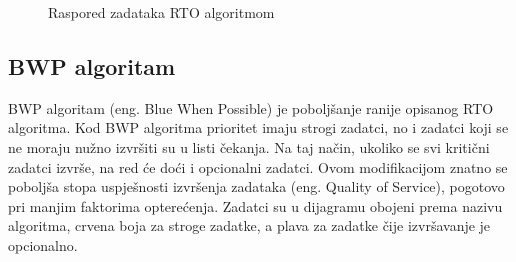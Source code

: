\documentclass[../zavrsni.tex]{subfiles}
\begin{document}
\begin{figure}[h]
    \centering

    \begin{RTGrid}[width=13cm]{3}{24}

    
  
    
    

    \end{RTGrid}

    \caption{Raspored zadataka RTO algoritmom}
    \label{fig:ex1}
  \end{figure}


\subsection{BWP algoritam}

BWP algoritam (eng. Blue When Possible) je poboljšanje ranije opisanog RTO algoritma. Kod BWP algoritma prioritet imaju strogi zadatci, 
no i zadatci koji se ne moraju nužno izvršiti su u listi čekanja. Na taj način, ukoliko se svi kritični zadatci izvrše, na red će doći
i opcionalni zadatci. Ovom modifikacijom znatno se poboljša stopa uspješnosti izvršenja zadataka (eng. Quality of Service), pogotovo pri
 manjim faktorima opterećenja. Zadatci su u dijagramu obojeni prema nazivu algoritma, crvena boja za stroge zadatke, a plava za zadatke 
 čije izvršavanje je opcionalno. 
\end{document}
